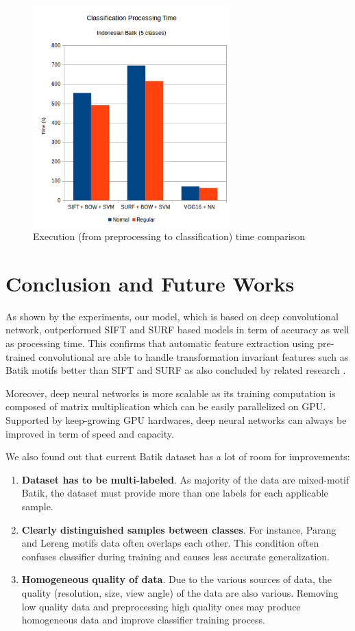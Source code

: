 \documentclass[conference]{IEEEtran}
\begin{document}
\begin{figure}
\centering
\includegraphics[width=3.0in]{chart_time}
\caption{Execution (from preprocessing to classification) time comparison}
\label{fig_time_comparison}
\end{figure}


\section{Conclusion and Future Works}

As shown by the experiments, our model, which is based on deep convolutional network, outperformed SIFT and SURF based models in term of accuracy as well as processing time. This confirms that automatic feature extraction using pre-trained convolutional are able to handle transformation invariant features such as Batik motifs better than SIFT and SURF as also concluded by related research \cite{fischer2014descriptor}.

Moreover, deep neural networks is more scalable as its training computation is composed of matrix multiplication which can be easily parallelized on GPU. Supported by keep-growing GPU hardwares, deep neural networks can always be improved in term of speed and capacity.

We also found out that current Batik dataset has a lot of room for improvements:

\begin{enumerate}
\item \textbf{Dataset has to be multi-labeled}. As majority of the data are mixed-motif Batik, the dataset must provide more than one labels for each applicable sample.
\item \textbf{Clearly distinguished samples between classes}. For instance, Parang and Lereng motifs data often overlaps each other. This condition often confuses classifier during training and causes less accurate generalization.
\item \textbf{Homogeneous quality of data}. Due to the various sources of data, the quality (resolution, size, view angle) of the data are also various. Removing low quality data and preprocessing high quality ones may produce homogeneous data and improve classifier training process.
\end{enumerate}

\ifCLASSOPTIONcaptionsoff
  \newpage
\fi




\end{document}
